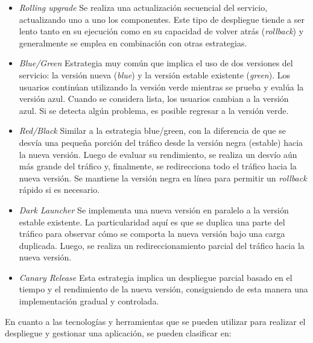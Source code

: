 \begin{itemize}
    \item \textit{Rolling upgrade}
    \newline
    Se realiza una actualización secuencial del servicio, actualizando uno a uno los componentes. Este tipo de despliegue 
    tiende a ser lento tanto en su ejecución como en su capacidad de volver atrás (\textit{rollback}) y generalmente se emplea en 
    combinación con otras estrategias.

    \item \textit{Blue/Green}
    \newline
    Estrategia muy común que implica el uso de dos versiones del servicio: la versión nueva (\textit{blue}) y la versión estable 
    existente (\textit{green}). Los usuarios continúan utilizando la versión verde mientras se prueba y evalúa la versión azul. 
    Cuando se considera lista, los usuarios cambian a la versión azul. Si se detecta algún problema, es posible regresar a la 
    versión verde.

    \item \textit{ Red/Black}
    \newline
    Similar a la estrategia blue/green, con la diferencia de que se desvía una pequeña porción del tráfico desde la 
    versión negra (estable) hacia la nueva versión. Luego de evaluar su rendimiento, se realiza un desvío aún más grande 
    del tráfico y, finalmente, se redirecciona todo el tráfico hacia la nueva versión. Se mantiene la versión negra en 
    línea para permitir un \textit{rollback} rápido si es necesario.

    \item \textit{Dark Launcher}
    \newline
    Se implementa una nueva versión en paralelo a la versión estable existente. La particularidad aquí es que se duplica 
    una parte del tráfico para observar cómo se comporta la nueva versión bajo una carga duplicada. Luego, se realiza un 
    redireccionamiento parcial del tráfico hacia la nueva versión.

    \item \textit{Canary Release}
    \newline
    Esta estrategia implica un despliegue parcial basado en el tiempo y el rendimiento de la nueva versión, consiguiendo
    de esta manera una implementación gradual y controlada.
\end{itemize}

En cuanto a las tecnologías y herramientas que se pueden utilizar para realizar el despliegue y gestionar una aplicación,
se pueden clasificar en:


